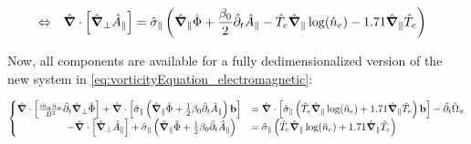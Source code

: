 \begin{align}
&\Leftrightarrow&
\hat{\grad}\cdot\left[\hat{\grad}_\perp \hat{A}_\parallel\right]
&= \hat{\sigma}_\parallel\left(
\hat{\grad}_\parallel\hat{\Phi}
+ \frac{\beta_0}{2}\hat{\partial}_t\hat{A}_\parallel
- \hat{T}_e\hat{\grad}_\parallel\log(\hat{n}_e)
- 1.71\hat{\grad}_\parallel \hat{T}_e\right) \nonumber		
\end{align}

Now, all components are available for a fully dedimensionalized version of the new system in \autoref{eq:vorticityEquation_electromagnetic}: 

\begin{align}
\label{eq:vorticityEquation_electromagnetic_dedimensionalized}
\begin{cases}
\hat{\grad}\cdot\left[\frac{\hat{m}_\alpha \hat{n}_\alpha}{ \hat{B}^2}\hat{\partial}_t\hat{\grad}_\perp\hat{\Phi}\right] + \hat{\grad}\cdot\left[\hat{\sigma}_\parallel\left(\hat{\grad}_\parallel\hat{\Phi}+ \frac{1}{2}\beta_0\hat{\partial}_t\hat{A}_\parallel\right)\mathbf{b}\right]
&= \hat{\grad}\cdot\left[\hat{\sigma}_\parallel\left(
\hat{T}_e\hat{\grad}_\parallel\log(\hat{n}_e) + 1.71\hat{\grad}_\parallel \hat{T}_e
\right)\mathbf{b}\right]-\hat{\partial}_t \hat{\Omega}_\pi \\
\qquad\qquad\quad-\hat{\grad}\cdot\left[\hat{\grad}_\perp \hat{A}_\parallel\right]
+ \hat{\sigma}_\parallel\left(\hat{\grad}_\parallel\hat{\Phi}
+ \frac{1}{2}\beta_0\hat{\partial}_t\hat{A}_\parallel\right) &= \hat{\sigma}_\parallel\left(
\hat{T}_e\hat{\grad}_\parallel\log(\hat{n}_e) + 1.71\hat{\grad}_\parallel \hat{T}_e
\right)
\end{cases}
\end{align}

